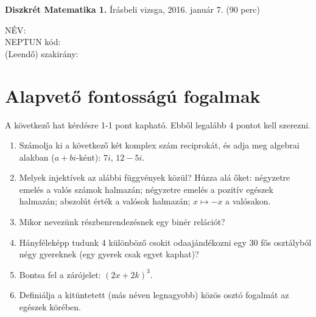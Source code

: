 \documentclass[11pt,a4paper]{article}
\begin{document}
\thispagestyle{empty}

\begin{center}
\begin{large}
\noindent \textbf{Diszkrét Matematika 1.} Írásbeli vizsga, 2016. január 7. (90 perc)
\end{large}
\end{center}

{\noindent NÉV: \\ NEPTUN kód:\\ (Leendő) szakirány:\\}
\section{Alapvető fontosságú fogalmak}
A következő hat kérdésre 1-1 pont kapható. Ebből legalább 4 pontot kell szerezni.
\begin{enumerate}\setlength{\itemsep}{3cm}

\item Számolja ki a következő két komplex szám reciprokát, és adja meg algebrai alakban ($a+bi$-ként): $7i$, $12-5i$.
\item Melyek injektívek az alábbi függvények közül? Húzza alá őket: négyzetre emelés a valós számok halmazán; négyzetre emelés a pozitív egészek halmazán; abszolút érték a valósok halmazán; $x\mapsto -x$ a valósakon.\vspace{-1.5cm}
\item Mikor nevezünk részbenrendezésnek egy binér relációt?
\item Hányféleképp tudunk 4 különböző csokit odaajándékozni egy 30 fős osztályból négy gyereknek (egy gyerek csak egyet kaphat)?\vspace{-1cm}
\item Bontsa fel a zárójelet: $(2x+2k)^3$. 
\item Definiálja a kitüntetett (más néven legnagyobb) közös osztó fogalmát az egészek körében.
\end{enumerate}

\newpage
\end{document}
